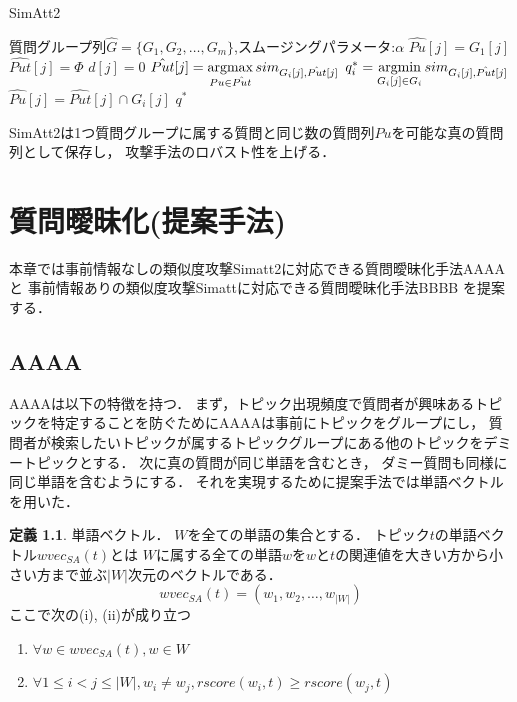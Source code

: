 \documentclass[master]{suribt}
\theoremstyle{definition}
\newtheorem{defi}[thm]{定義}
\newcommand{\argmax}{\mathop{\rm argmax}\limits}
\newcommand{\argmin}{\mathop{\rm argmin}\limits}
\begin{document}
 \begin{algorithm}
 \caption{SimAtt2}
 \begin{algorithmic}[1]
  \Require 質問グループ列$\hat{G}=\{ G_1,G_2, \dots , G_m\}$,スムージングパラメータ:$\alpha$
   \State $\hat{Pu}[j] = G_1[j]$
   \State $\hat{Put}[j] = \Phi$
   \State $d[j] = 0$
  \EndFor
   \State $\hat{Put}[j] = \argmax_{Pu \in \hat{Put}}sim_{G_i[j],\hat{Put}[j]}$
   \EndFor
   \State $q^*_i = \argmin_{G_i[j] \in G_i}sim_{G_i[j],\hat{Put}[j]}$
    \State $\hat{Pu}[j] = \hat{Put}[j] \cap G_i[j]$
   \EndFor
  \EndFor
  \Ensure $q^*$
 \end{algorithmic}
 \label{a:simatt2}
 \end{algorithm}
 
 SimAtt2は1つ質問グループに属する質問と同じ数の質問列$Pu$を可能な真の質問列として保存し，
 攻撃手法のロバスト性を上げる．


 \chapter{質問曖昧化(提案手法)}
 本章では事前情報なしの類似度攻撃Simatt2に対応できる質問曖昧化手法AAAA
 と
 事前情報ありの類似度攻撃Simattに対応できる質問曖昧化手法BBBB
 を提案する．
 
 \section{AAAA}
 AAAAは以下の特徴を持つ．
 まず，トピック出現頻度で質問者が興味あるトピックを特定することを防ぐためにAAAAは事前にトピックをグループにし，
 質問者が検索したいトピックが属するトピックグループにある他のトピックをデミートピックとする．
 次に真の質問が同じ単語を含むとき， ダミー質問も同様に同じ単語を含むようにする．
 それを実現するために提案手法では単語ベクトルを用いた．
 
 \begin{defi}{単語ベクトル．}
 $W$を全ての単語の集合とする．
 トピック$t$の単語ベクトル$wvec_{SA}(t)$とは
 $W$に属する全ての単語$w$を$w$と$t$の関連値を大きい方から小さい方まで並ぶ$|W|$次元のベクトルである．
 \begin{equation}
  wvec_{SA}(t)  = (w_1,w_2, \dots , w_{|W|})
 \end{equation}
 ここで次の(i), (ii)が成り立つ
 \begin{enumerate}
 \renewcommand{\labelenumi}{(\roman{enumi})}
 \item $\forall w \in wvec_{SA}(t), w \in W$ 
 \item $\forall 1 \leq i < j \leq |W|,w_i \neq w_j,rscore(w_i,t) \geq rscore(w_j,t)$
 \end{enumerate}
 \end{defi}
\end{document}
